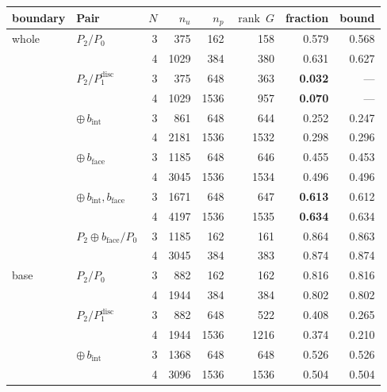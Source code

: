 \documentclass[11pt]{article}
\theoremstyle{definition}
\theoremstyle{plain}
\begin{document}
\begin{table}[h]
\centering
\begin{tabular}{@{}llrrrrrr@{}}
\toprule
boundary & Pair & $N$ & $n_u$ & $n_p$ & $\operatorname{rank}~G$ & fraction & bound \\
\midrule
whole & $P_2/P_0$                 & 3 & 375  & 162  & 158  & 0.579 & 0.568 \\
      &                           & 4 & 1029 & 384  & 380  & 0.631 & 0.627 \\
      & $P_2/P_1^{\mathrm{disc}}$ & 3 & 375  & 648  & 363  & \textbf{0.032} & --- \\
      &                           & 4 & 1029 & 1536 & 957  & \textbf{0.070} & --- \\
      & $\oplus\, b_{\mathrm{int}}$
                                  & 3 & 861  & 648  & 644  & 0.252 & 0.247 \\
      &                           & 4 & 2181 & 1536 & 1532 & 0.298 & 0.296 \\
      & $\oplus\, b_{\mathrm{face}}$
                                  & 3 & 1185 & 648  & 646  & 0.455 & 0.453 \\
      &                           & 4 & 3045 & 1536 & 1534 & 0.496 & 0.496 \\
      & $\oplus\, b_{\mathrm{int}}, b_{\mathrm{face}}$
                                  & 3 & 1671 & 648  & 647  & \textbf{0.613} & 0.612 \\
      &                           & 4 & 4197 & 1536 & 1535 & \textbf{0.634} & 0.634 \\
      & $P_2 \oplus b_{\mathrm{face}}/P_0$
                                  & 3 & 1185 & 162  & 161  & 0.864 & 0.863 \\
      &                           & 4 & 3045 & 384  & 383  & 0.874 & 0.874 \\
\midrule
base  & $P_2/P_0$                 & 3 & 882  & 162  & 162  & 0.816 & 0.816 \\
      &                           & 4 & 1944 & 384  & 384  & 0.802 & 0.802 \\
      & $P_2/P_1^{\mathrm{disc}}$ & 3 & 882  & 648  & 522  & 0.408 & 0.265 \\
      &                           & 4 & 1944 & 1536 & 1216 & 0.374 & 0.210 \\
      & $\oplus\, b_{\mathrm{int}}$
                                  & 3 & 1368 & 648  & 648  & 0.526 & 0.526 \\
      &                           & 4 & 3096 & 1536 & 1536 & 0.504 & 0.504 \\

\end{tabular}
\end{table}
\end{document}
